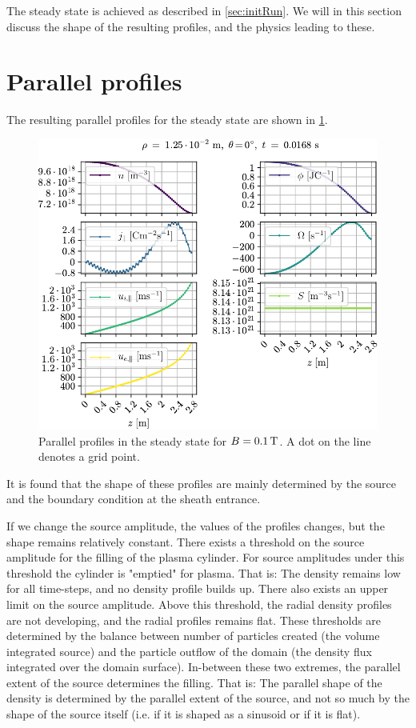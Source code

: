 The steady state is achieved as described in \cref{sec:initRun}.
We will in this section discuss the shape of the resulting profiles, and the physics leading to these.

\section{Parallel profiles}
\label{sec:parProf}
%
The resulting parallel profiles for the steady state are shown in \cref{fig:parProfs}.
%
\begin{figure}[htb]
    \centering
    \includegraphics{fig/results/1DProfiles/B010Par}
    \caption{Parallel profiles in the steady state for $B=0.1\, \text{T}$.
        A dot on the line denotes a grid point.}
    \label{fig:parProfs}
\end{figure}
%
It is found that the shape of these profiles are mainly determined by the source and the boundary condition at the sheath entrance.

If we change the source amplitude, the values of the profiles changes, but the shape remains relatively constant.
There exists a threshold on the source amplitude for the filling of the plasma cylinder.
For source amplitudes under this threshold the cylinder is "emptied" for plasma.
That is: The density remains low for all time-steps, and no density profile builds up.
There also exists an upper limit on the source amplitude.
Above this threshold, the radial density profiles are not developing, and the radial profiles remains flat.
These thresholds are determined by the balance between number of particles created (the volume integrated source) and the particle outflow of the domain (the density flux integrated over the domain surface).
In-between these two extremes, the parallel extent of the source determines the filling.
That is: The parallel shape of the density is determined by the parallel extent of the source, and not so much by the shape of the source itself (i.e. if it is shaped as a sinusoid or if it is flat).


